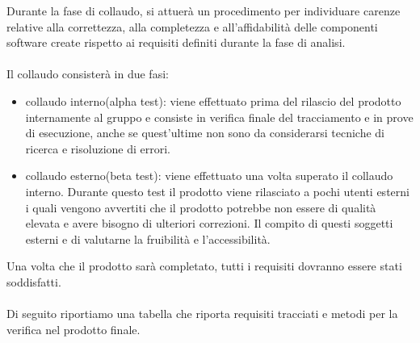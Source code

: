 Durante la fase di collaudo, si attuer\`a un procedimento per individuare carenze
relative alla correttezza, alla completezza e all'affidabilit\`a delle componenti 
software create rispetto ai requisiti definiti durante la fase di analisi.\\ \\
Il collaudo consister\`a in due fasi: 

\begin{itemize}
  \item collaudo interno(alpha test): viene effettuato prima del rilascio
  del prodotto internamente al gruppo e consiste in verifica finale del tracciamento 
  e in prove di esecuzione, anche se quest'ultime non sono da considerarsi tecniche di
  ricerca e risoluzione di errori.
  \item collaudo esterno(beta test): viene effettuato una volta superato il
  collaudo interno. Durante questo test il prodotto viene rilasciato a
  pochi utenti esterni i quali vengono avvertiti che il prodotto potrebbe non essere 
  di qualit\`a elevata e avere bisogno di ulteriori correzioni. 
  Il compito di questi soggetti esterni e di valutarne la fruibilit\`a e l'accessibilit\`a.
\end{itemize}

Una volta che il prodotto sar\`a completato, tutti i requisiti dovranno essere
stati soddisfatti.\\
\\
Di seguito riportiamo una tabella che riporta requisiti tracciati e metodi per
la verifica nel prodotto finale.

